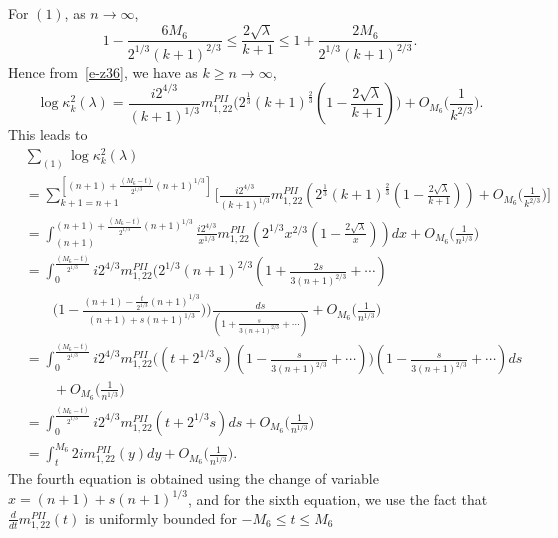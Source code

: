 \documentclass{amsart}
\theoremstyle{definition}
\theoremstyle{remark}
\numberwithin{equation}{section}
\begin{document}
\medskip
For $(1)$, as $n\to\infty$,  
\begin{equation*}
  1-\frac{6M_6}{2^{1/3}{(k+1)}^{2/3}} \le 
\frac{2\sqrt{\lambda}}{k+1} \le 1+\frac{2M_6}{2^{1/3}{(k+1)}^{2/3}}.
\end{equation*} 
Hence from~\eqref{e-z36}, 
we have as $k\geq n\to\infty$,  
\begin{equation*}
\log \kappa^2_k(\lambda)
= \frac{i2^{4/3}}{{(k+1)}^{1/3}} m^{PII}_{1,22}
\biggl(2^{\frac13}{(k+1)}^{\frac23}(1-\frac{2\sqrt{\lambda}}{k+1})\biggr) 
+O_{M_6}\bigl(\frac1{k^{2/3}}\bigr).
\end{equation*}
This leads to 
\begin{equation*}
  \begin{split}
    &\sum_{(1)} \log{\kappa^2_{k}}(\lambda)\\
    &= \sum_{k+1=n+1}^{[(n+1)+\frac{(M_6-t)}{2^{1/3}}{(n+1)}^{1/3}]} 
\biggl[ \frac{i2^{4/3}}{{(k+1)}^{1/3}} 
m^{PII}_{1,22}(2^{\frac13}{(k+1)}^{\frac23}(1-\frac{2\sqrt{\lambda}}{k+1})) 
+ O_{M_6}\bigl(\frac1{k^{2/3}}\bigr) \biggr]\\
    &= \int_{(n+1)}^{(n+1)+\frac{(M_6-t)}{2^{1/3}}{(n+1)}^{1/3}} 
\frac{i2^{4/3}}{x^{1/3}} 
m^{PII}_{1,22}(2^{1/3}x^{2/3}(1-\frac{2\sqrt{\lambda}}{x})) dx  +
O_{M_6}\bigl(\frac1{n^{1/3}}\bigr)\\
    &= \int_{0}^{\frac{(M_6-t)}{2^{1/3}}} i2^{4/3} 
m^{PII}_{1,22}\biggl(2^{1/3}{(n+1)}^{2/3}
(1+\frac{2s}{3{(n+1)}^{2/3}} +\cdots)\\ 
    &\qquad \bigl(1-\frac{(n+1)-\frac{t}{2^{1/3}}(n+1)^{1/3}}
{(n+1)+s{(n+1)}^{1/3}}\bigr)\biggr)
     \frac{ds}
{(1+\frac{s}{3{(n+1)}^{2/3}}+\cdots)} +
O_{M_6}\bigl(\frac1{n^{1/3}}\bigr)\\
    &=\int_0^{\frac{(M_6-t)}{2^{1/3}}} i2^{4/3} 
m^{PII}_{1,22}\biggl((t+2^{1/3}s)(1-\frac{s}{3{(n+1)}^{2/3}} +\cdots)\biggr)(1-\frac{s}{3{(n+1)}^{2/3}} +\cdots)ds \\
&\qquad + O_{M_6}\bigl(\frac1{n^{1/3}}\bigr)\\
    &= \int_0^{\frac{(M_6-t)}{2^{1/3}}} i2^{4/3} 
m^{PII}_{1,22}(t+2^{1/3}s) ds 
+O_{M_6}\bigl(\frac1{n^{1/3}}\bigr)\\
    &= \int_{t}^{M_6} 2im^{PII}_{1,22}(y) dy 
+O_{M_6}\bigl(\frac1{n^{1/3}}\bigr).
  \end{split}
\end{equation*}
The fourth equation is obtained using the change of variable 
$x=(n+1)+s{(n+1)}^{1/3}$, and for the sixth equation, 
we use the fact that $\frac{d}{dt}m^{PII}_{1,22}(t)$ 
is uniformly bounded for $-M_6\le t\le M_6$ 
\end{document}
